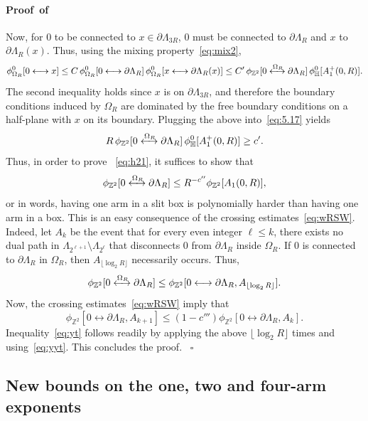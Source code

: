 \documentclass[a4paper,oneside,11pt]{article}
\numberwithin{equation}{section}
\numberwithin{equation}{section}
\numberwithin{equation}{section}
\newenvironment{proof}[1][\relax]%
  {\paragraph{Proof\ifx#1\relax\else~of #1\fi}}%
  {~\hfill$\square$\par\bigskip}
\newcommand{\bbH}{\mathbb{H}}
\newcommand{\bbZ}{\mathbb{Z}}
\newcommand{\La}{\Lambda}
\begin{document}
\begin{proof}
Now, for 0 to be connected to $x \in \partial \La_{3R}$, 0 must be connected to $\partial\Lambda_R$ and $x$ to $\partial\Lambda_R(x)$. 
Thus, using the mixing property~\eqref{eq:mix2},
\begin{equation*}
	\phi_{\Omega_R}^0[0\longleftrightarrow x]
	\le C\,\phi_{\Omega_R}^0[0\longleftrightarrow\partial\Lambda_R]\,\phi_{\Omega_R}^0[x\longleftrightarrow\partial\Lambda_R(x)]
	\le C'\,\phi_{\bbZ^2}[0\xleftrightarrow{\Omega_R}\partial\Lambda_R] \, \phi_{\bbH}^0[A^+_1(0,R)].
\end{equation*}
The second inequality holds since $x$ is on $\partial\Lambda_{3R}$, and therefore the boundary conditions induced by $\Omega_R$ are dominated by the free boundary conditions on a half-plane with $x$ on its boundary. 
Plugging the above into~\eqref{eq:5.17} yields
\begin{equation*}
	R \, \phi_{\bbZ^2}[0\xleftrightarrow{\Omega_R}\partial\Lambda_R] \, \phi_{\bbH}^0[A^+_1(0,R)] \geq c'.
\end{equation*}
Thus, in order to prove ~\eqref{eq:h21}, it suffices to show that 
\begin{equation}\label{eq:yt}
	\phi_{\bbZ^2}[0\xleftrightarrow{\Omega_R}  \partial\Lambda_R]\le R^{-c''}\phi_{\bbZ^2}[A_1(0,R)],
\end{equation}
or in words, having one arm in a slit box is polynomially harder than having one arm in a box.
This is an easy consequence of the crossing estimates~\eqref{eq:wRSW}. 
Indeed, let $A_{k}$ be the event that for every even integer $\ell\le k$, 
there exists no dual path in $\La_{2^{\ell+1}}\setminus \La_{2^\ell}$ that disconnects $0$ from $\partial\Lambda_R$ inside $\Omega_R$. 
If $0$ is connected to $\partial \La_R$ in $\Omega_R$, then $A_{\lfloor \log_2R\rfloor}$ necessarily occurs. Thus,  
\begin{equation}\label{eq:yyt}
	\phi_{\bbZ^2}[0\xleftrightarrow{\Omega_R}  \partial\Lambda_R]\le \phi_{\bbZ^2}[0\longleftrightarrow\partial\Lambda_R,A_{\lfloor \log_2R\rfloor}].
\end{equation}
Now, the crossing estimates~\eqref{eq:wRSW} imply that 
$$\phi_{\bbZ^2}[0\longleftrightarrow\partial\Lambda_R,A_{k+1}]\le (1-c''')\phi_{\bbZ^2}[0\longleftrightarrow\partial\Lambda_R,A_{k}].$$
Inequality~\eqref{eq:yt} follows readily by applying the above $\lfloor\log_2 R\rfloor$ times and using~\eqref{eq:yyt}. This concludes the proof.
\end{proof}




\subsection{New bounds on the one, two and four-arm exponents}\label{sec:perco}
\end{document}
